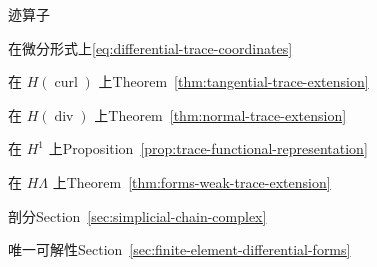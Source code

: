 \par\noindent\hspace*{0em}\label{index:trace-operator}{迹算子}

\par\noindent\hspace*{1em}\label{index:trace-operator-on-differential-forms}{在微分形式上}\quad \eqref{eq:differential-trace-coordinates}

\par\noindent\hspace*{1em}\label{index:trace-operator-on-h-operatorname-curl}{在 $H(\operatorname{curl})$ 上}\quad Theorem~\ref{thm:tangential-trace-extension}

\par\noindent\hspace*{1em}\label{index:trace-operator-on-h-operatorname-div}{在 $H(\operatorname{div})$ 上}\quad Theorem~\ref{thm:normal-trace-extension}

\par\noindent\hspace*{1em}\label{index:trace-operator-on-h-1}{在 $H^1$ 上}\quad Proposition~\ref{prop:trace-functional-representation}

\par\noindent\hspace*{1em}\label{index:trace-operator-on-h-lambda}{在 $H\Lambda$ 上}\quad Theorem~\ref{thm:forms-weak-trace-extension}

\par\noindent\hspace*{0em}\label{index:triangulation}{剖分}\quad Section~\ref{sec:simplicial-chain-complex}

\par\noindent\hspace*{0em}\label{index:unisolvence}{唯一可解性}\quad Section~\ref{sec:finite-element-differential-forms}

